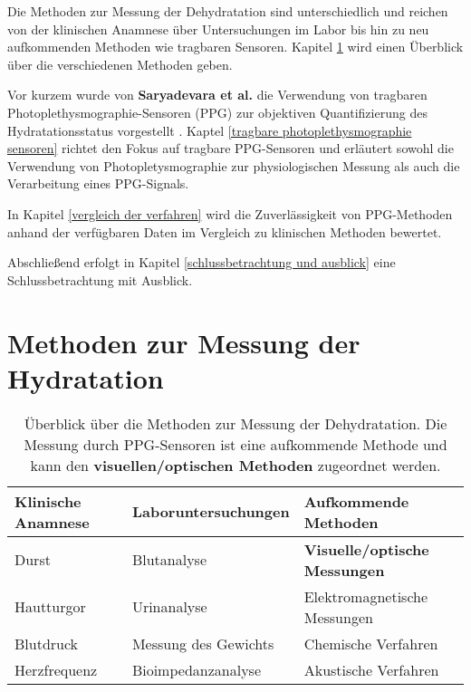 \documentclass[10pt,a4paper,headinclude,twoside, plainheadsepline, open=right, numbers=noenddot, twocolumn]{article}
\begin{document}
Die Methoden zur Messung der Dehydratation sind unterschiedlich und reichen von der klinischen Anamnese über Untersuchungen im Labor bis hin zu neu aufkommenden Methoden wie tragbaren Sensoren.
Kapitel \ref{methoden zur messung der hydratation} wird einen Überblick über die verschiedenen Methoden geben. 

Vor kurzem wurde von \textbf{Saryadevara et al.} die Verwendung von tragbaren Photoplethysmographie-Sensoren (PPG) zur objektiven Quantifizierung des Hydratationsstatus vorgestellt \cite{suryadevara2015towards}.
Kaptel \ref{tragbare photoplethysmographie sensoren} richtet den Fokus auf tragbare PPG-Sensoren und erläutert sowohl die Verwendung von Photopletysmographie zur physiologischen Messung als auch die Verarbeitung eines PPG-Signals.

In Kapitel \ref{vergleich der verfahren} wird die Zuverlässigkeit von PPG-Methoden anhand der verfügbaren Daten im Vergleich zu klinischen Methoden bewertet.

Abschließend erfolgt in Kapitel \ref{schlussbetrachtung und ausblick} eine Schlussbetrachtung mit Ausblick. 



\section{Methoden zur Messung der Hydratation}
\label{methoden zur messung der hydratation}

\begin{table*}[ht]
\centering
\begin{tabular*}{13cm}{lll}
Klinische Anamnese & Laboruntersuchungen & Aufkommende Methoden  \\\hline
Durst & Blutanalyse  & \textbf{Visuelle/optische Messungen} \\
Hautturgor & Urinanalyse & Elektromagnetische Messungen \\
Blutdruck & Messung des Gewichts & Chemische Verfahren \\
Herzfrequenz & Bioimpedanzanalyse & Akustische Verfahren \\\hline
\end{tabular*}
\caption{Überblick über die Methoden zur Messung der Dehydratation. Die Messung durch PPG-Sensoren ist eine aufkommende Methode und kann den \textbf{visuellen/optischen Methoden} zugeordnet werden.}
\label{methodenübersicht}
\end{table*}
\end{document}
